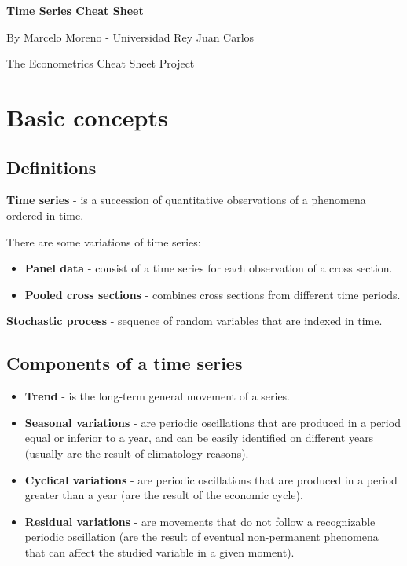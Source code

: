 \documentclass[10pt, a4paper, landscape]{article}
\begin{document}
	\begin{multicols}{3}
		\begin{center}
			\textbf{\LARGE \href{https://github.com/marcelomijas/econometrics-cheatsheet}{Time Series Cheat Sheet}}
			
			{\footnotesize By Marcelo Moreno - Universidad Rey Juan Carlos}
			
			{\footnotesize The Econometrics Cheat Sheet Project}
		\end{center}
		
		\section*{Basic concepts}
		
		\subsection*{Definitions}
		
		\textbf{Time series} - is a succession of quantitative observations of a phenomena ordered in time.
		
		There are some variations of time series:
		
		\begin{itemize}[leftmargin=*]
			\item \textbf{Panel data} - consist of a time series for each observation of a cross section.
			\item \textbf{Pooled cross sections} - combines cross sections from different time periods.
		\end{itemize}
		
		\textbf{Stochastic process} - sequence of random variables that are indexed in time.
		
		\subsection*{Components of a time series}
		
		\begin{itemize}[leftmargin=*]
			\item \textbf{Trend} - is the long-term general movement of a series.
			\item \textbf{Seasonal variations} - are periodic oscillations that are produced in a period equal or inferior to a year, and can be easily identified on different years (usually are the result of climatology reasons).
			\item \textbf{Cyclical variations} - are periodic oscillations that are produced in a period greater than a year (are the result of the economic cycle).
			\item \textbf{Residual variations} - are movements that do not follow a recognizable periodic oscillation (are the result of eventual non-permanent phenomena that can affect the studied variable in a given moment).
		\end{itemize}
		

\end{multicols}
\end{document}
